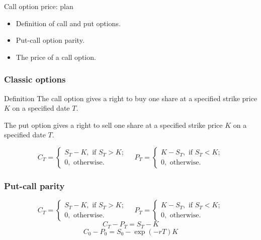 
\begin{frame} %

    
    \end{frame}
    
    
    \begin{frame}{Call option price: plan}
    
      \begin{itemize}[<+->]
        \item Definition of \alert{call} and \alert{put} options. 
        \item Put-call option \alert{parity}. 
        \item The price of a \alert{call} option. 
      \end{itemize}
    
    \end{frame}
    
    \begin{frame}
      \frametitle{Classic options}
    
      \begin{block}{Definition \formalduck}
        The call option gives a \alert{right} to \alert{buy} one share at a specified strike price $K$ on a specified date $T$.   

        The put option gives a \alert{right} to \alert{sell} one share at a specified strike price $K$ on a specified date $T$.   
      \end{block}
      \pause 
      \[
      C_T = \begin{cases}
          S_T - K, \text{ if } S_T > K; \\
          0, \text{ otherwise.}
      \end{cases}  \quad
      P_T = \begin{cases}
        K - S_T, \text{ if } S_T < K; \\
        0, \text{ otherwise.}        
      \end{cases}  
      \]
    \end{frame}
    
    \begin{frame}
        \frametitle{Put-call parity}
        \[
      C_T = \begin{cases}
          S_T - K, \text{ if } S_T > K; \\
          0, \text{ otherwise.}
      \end{cases}  \quad
      P_T = \begin{cases}
        K - S_T, \text{ if } S_T < K; \\
        0, \text{ otherwise.}        
      \end{cases}  
      \]
    \pause 
    \[
    C_T - P_T = S_T - K    
    \]
    \pause 
    \[
    C_0 - P_0 = S_0 - \exp(-rT) K    
    \]        
    \end{frame}

